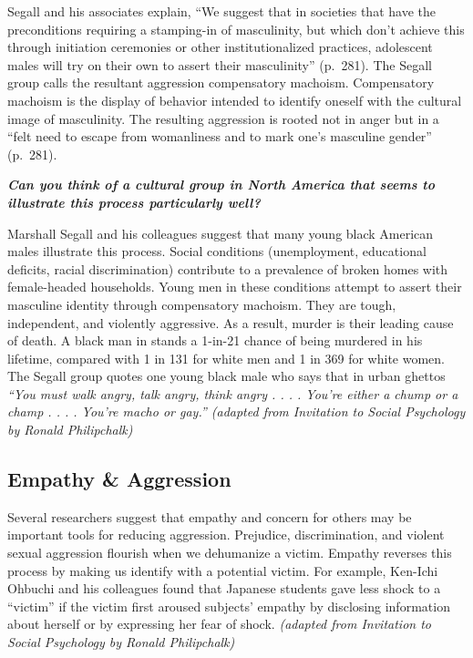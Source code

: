 \documentclass[
]{book}
\begin{document}
Segall and his associates explain, ``We suggest that in societies that have the preconditions requiring a stamping-in of masculinity, but which don't achieve this through initiation ceremonies or other institutionalized practices, adolescent males will try on their own to assert their masculinity'' (p.~281). The Segall group calls the resultant aggression compensatory machoism. Compensatory machoism is the display of behavior intended to identify oneself with the cultural image of masculinity. The resulting aggression is rooted not in anger but in a ``felt need to escape from womanliness and to mark one's masculine gender'' (p.~281).

\begin{caution}
\textbf{\emph{Can you think of a cultural group in North America that seems to illustrate this process particularly well?}}
\end{caution}

Marshall Segall and his colleagues suggest that many young black American males illustrate this process. Social conditions (unemployment, educational deficits, racial discrimination) contribute to a prevalence of broken homes with female-headed households. Young men in these conditions attempt to assert their masculine identity through compensatory machoism. They are tough, independent, and violently aggressive. As a result, murder is their leading cause of death. A black man in stands a 1-in-21 chance of being murdered in his lifetime, compared with 1 in 131 for white men and 1 in 369 for white women. The Segall group quotes one young black male who says that in urban ghettos \emph{``You must walk angry, talk angry, think angry . . . . You're either a chump or a champ . . . . You're macho or gay.'' (adapted from Invitation to Social Psychology by Ronald Philipchalk)}

\hypertarget{empathy-aggression}{%
\subsection*{Empathy \& Aggression}\label{empathy-aggression}}

Several researchers suggest that empathy and concern for others may be important tools for reducing aggression. Prejudice, discrimination, and violent sexual aggression flourish when we dehumanize a victim. Empathy reverses this process by making us identify with a potential victim. For example, Ken-Ichi Ohbuchi and his colleagues found that Japanese students gave less shock to a ``victim'' if the victim first aroused subjects' empathy by disclosing information about herself or by expressing her fear of shock. \emph{(adapted from Invitation to Social Psychology by Ronald Philipchalk)}
\end{document}
